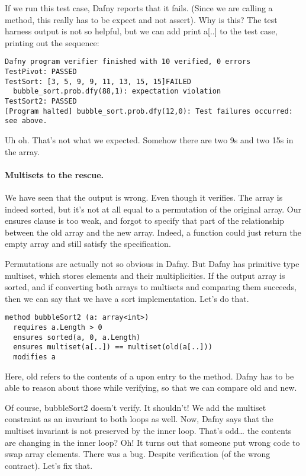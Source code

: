 \documentclass[11pt]{article}
\begin{document}
If we run this test case, Dafny reports that it fails. (Since we are calling a method,
this really has to be \textsf{expect} and not \textsf{assert}). Why is this?
The test harness output is not so helpful, but we can add \textsf{print a[..]} to the test case,
printing out
the sequence:
\begin{verbatim}
Dafny program verifier finished with 10 verified, 0 errors
TestPivot: PASSED
TestSort: [3, 5, 9, 9, 11, 13, 15, 15]FAILED
  bubble_sort.prob.dfy(88,1): expectation violation
TestSort2: PASSED
[Program halted] bubble_sort.prob.dfy(12,0): Test failures occurred: see above.
\end{verbatim}
Uh oh. That's not what we expected. Somehow there are two 9s and two 15s in the array.

\paragraph{Multisets to the rescue.} 
We have seen that the output is wrong. Even though it verifies.
The array is indeed sorted, but it's not at all equal to a permutation of the original array.
Our \textsf{ensures} clause is too weak, and forgot to specify that part of the relationship between
the old array and the new array. Indeed, a function could just return the empty array and still satisfy
the specification.

Permutations are actually not so obvious in Dafny. But Dafny has primitive type \textsf{multiset}, which stores
elements and their multiplicities. If the output array is sorted, and if converting both arrays to multisets
and comparing them succeeds, then we can say that we have a sort implementation. Let's do that.

\begin{lstlisting}[language=dafny]
method bubbleSort2 (a: array<int>)
  requires a.Length > 0
  ensures sorted(a, 0, a.Length)
  ensures multiset(a[..]) == multiset(old(a[..]))
  modifies a
\end{lstlisting}

Here, \textsf{old} refers to the contents of \textsf{a} upon entry to the method. Dafny has to be able to
reason about those while verifying, so that we can compare old and new.

Of course, \textsf{bubbleSort2} doesn't verify. It shouldn't! We add the multiset constraint as an invariant to
both loops as well. Now, Dafny says that the multiset invariant is not preserved by the inner loop. That's odd\ldots
the contents are changing in the inner loop? Oh! It turns out that someone put wrong code to swap array elements.
There was a bug. Despite verification (of the wrong contract). Let's fix that.
\end{document}
